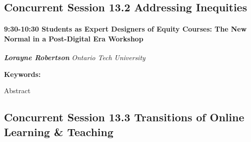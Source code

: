 \documentclass[
]{book}
\begin{document}
\hypertarget{concurrent-session-13.2-addressing-inequities}{%
\subsection*{Concurrent Session 13.2 \textbar{} Addressing Inequities}\label{concurrent-session-13.2-addressing-inequities}}

\begin{workshop}
\hypertarget{students-as-expert-designers-of-equity-courses-the-new-normal-in-a-post-digital-era-workshop}{%
\paragraph*{\texorpdfstring{9:30-10:30 \textbar{} \textbf{Students as
Expert Designers of Equity Courses: The New Normal in a Post-Digital
Era} \textbar{}
Workshop}{9:30-10:30 \textbar{} Students as Expert Designers of Equity Courses: The New Normal in a Post-Digital Era \textbar{} Workshop}}\label{students-as-expert-designers-of-equity-courses-the-new-normal-in-a-post-digital-era-workshop}}

\textbf{\emph{Lorayne Robertson}} \textbar{} \emph{Ontario Tech
University}

\textbf{Keywords:}

Abstract
\end{workshop}

\hypertarget{concurrent-session-13.3-transitions-of-online-learning-teaching}{%
\subsection*{Concurrent Session 13.3 \textbar{} Transitions of Online Learning \& Teaching}\label{concurrent-session-13.3-transitions-of-online-learning-teaching}}
\end{document}
